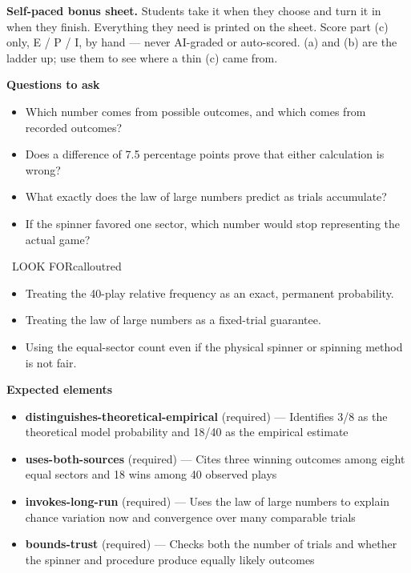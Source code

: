 \documentclass[11pt]{article}
\begin{document}
\textbf{Self-paced bonus sheet.} Students take it when they choose and turn it in when they finish. Everything they need is printed on the sheet. Score part (c) only, E / P / I, by hand --- never AI-graded or auto-scored. (a) and (b) are the ladder up; use them to see where a thin (c) came from.\par

\textbf{Questions to ask}
\begin{itemize}[leftmargin=1.5em,itemsep=2pt,topsep=2pt]
  \item Which number comes from possible outcomes, and which comes from recorded outcomes?
  \item Does a difference of 7.5 percentage points prove that either calculation is wrong?
  \item What exactly does the law of large numbers predict as trials accumulate?
  \item If the spinner favored one sector, which number would stop representing the actual game?
\end{itemize}

\begin{callout}{\IconWarn\ LOOK FOR}{calloutred}
\begin{itemize}[leftmargin=1.5em,itemsep=2pt,topsep=2pt]
  \item Treating the 40-play relative frequency as an exact, permanent probability.
  \item Treating the law of large numbers as a fixed-trial guarantee.
  \item Using the equal-sector count even if the physical spinner or spinning method is not fair.
\end{itemize}
\end{callout}


\textbf{Expected elements}
\begin{itemize}[leftmargin=1.5em,itemsep=2pt,topsep=2pt]
  \item \textbf{distinguishes-theoretical-empirical} (required) --- Identifies 3/8 as the theoretical model probability and 18/40 as the empirical estimate
  \item \textbf{uses-both-sources} (required) --- Cites three winning outcomes among eight equal sectors and 18 wins among 40 observed plays
  \item \textbf{invokes-long-run} (required) --- Uses the law of large numbers to explain chance variation now and convergence over many comparable trials
  \item \textbf{bounds-trust} (required) --- Checks both the number of trials and whether the spinner and procedure produce equally likely outcomes
\end{itemize}
\end{document}

